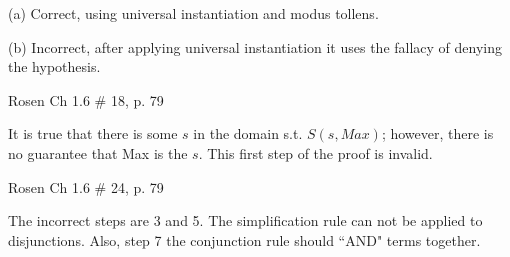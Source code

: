 \documentclass[12pt,addpoints]{exam}
\newenvironment{my_item}{
\begin{itemize}
    \setlength{\itemsep}{1pt}
    \setlength{\parskip}{0pt}
    \setlength{\parsep}{0pt}
}{\end{itemize}}
\begin{document}
\begin{questions}
    \begin{solution}
    \begin{my_item}
        \item[(a)] Correct, using universal instantiation and modus tollens.
        \item[(b)] Incorrect, after applying universal instantiation it uses the fallacy of denying the hypothesis.
    \end{my_item}
    \end{solution}


\question[4] Rosen Ch 1.6 \# 18, p. 79

    \begin{solution}
    It is true that there is some $s$ in the domain s.t. $S(s,Max)$; however, there is no guarantee that Max is the $s$.  This first step of the proof is invalid.
    \end{solution}


\question[4] Rosen Ch 1.6 \# 24, p. 79

    \begin{solution}
    The incorrect steps are 3 and 5.  The simplification rule can not be applied to disjunctions.  Also, step 7 the conjunction rule should ``AND" terms together.
    \end{solution}


\end{questions}
\end{document}
